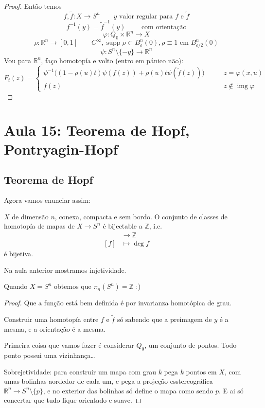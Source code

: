 \begin{proof}
Então temos
\[f, \tilde{f}: X \to S^n \qquad  \text{\(y\) valor regular para \(f\) e \(\tilde{f}\)} \]
\[f^{-1}(y)=\tilde{f}^{-1}(y)\qquad  \text{ com orientação} \]
\[\varphi:Q_0 \times \mathbb{R}^n \longrightarrow X\]
\[\rho: \mathbb{R}^n \longrightarrow [0,1]\qquad  C^\infty, \operatorname{supp}\rho \subset B^n_\varepsilon(0), \rho \equiv 1 \text{ em } B^n_{\varepsilon/2}(0)\]
 \[\psi:S^n\setminus \{ -y\}\longrightarrow \mathbb{R}^n\]
Vou para \(\mathbb{R}^n\), faço homotopía e volto (entro em pánico não):
 \[F_t(z)=\begin{cases}
	\psi^{-1}\Big((1-\rho(u)t)\psi(f(z))+\rho(u)t\psi(\tilde{f}(z))\Big)\qquad &z= \varphi(x,u) \\
	f(z)\qquad & z \not \in \operatorname{img}\varphi
\end{cases}\]
\end{proof}

\section{Aula 15: Teorema de Hopf, Pontryagin-Hopf}

\subsection{Teorema de Hopf}

Agora vamos enunciar assim:

\begin{thm}[Hopf]\leavevmode
\(X\) de dimensão \(n\), conexa, compacta e sem bordo. O conjunto de classes de homotopía de mapas de \(X \to S^{n}\) é bijectable a \(\mathbb{Z}\), i.e.
\begin{align*}
	[X,S^n] &\longrightarrow \mathbb{Z} \\
	[f] &\longmapsto \operatorname{deg}f
\end{align*}
é bijetiva.
\end{thm}

\begin{remark}\leavevmode
	Na aula anterior mostramos injetividade.
\end{remark}

\begin{coro}\leavevmode
Quando \(X=S^n\) obtemos que \(\pi_{n}(S^{n})=\mathbb{Z}\) :)
\end{coro}

\begin{proof}\leavevmode
Que a função está bem definida é por invarianza homotópica de grau.

Construir uma homotopía entre \(f\) e \(\tilde{f}\) só sabendo que a preimagem de \(y\) é a mesma, e a orientação é a mesma.

	Primeira coisa que vamos fazer é considerar \(Q_0\), um conjunto de pontos. Todo ponto possui uma  vizinhança…

	Sobrejetividade: para construir um mapa com grau \(k\) pega \(k\) pontos em \(X\), com umas bolinhas aordedor de cada um, e pega a projeção esstereográfica \(\mathbb{R}^n \to S^n\setminus \{ p\}\), e no exterior das bolinhas só define o mapa como sendo \(p\). E ai só concertar que tudo fique orientado e suave.
\end{proof}

